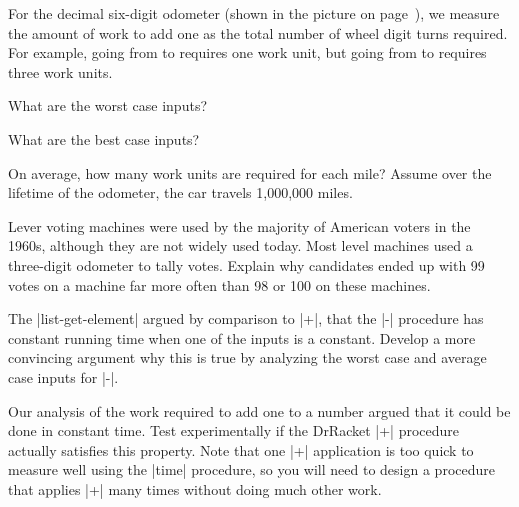 \begin{schemeregion}
\beforesplitex
\begin{exercise}
For the decimal six-digit odometer (shown in the picture on page~\pageref{picture:odometer}), we measure the amount of work to add one as the total number of wheel digit turns required.  For example, going from  to  requires one work unit, but going from  to  requires three work units.
\begin{subexerciselist}
\item What are the worst case inputs?
\solution{\LATER{}}
\item What are the best case inputs?
\solution{\LATER{}}
\item \goldstar On average, how many work units are required for each mile?  Assume over the lifetime of the odometer, the car travels 1,000,000 miles.
\solution{\LATER{}}
\item Lever voting machines were used by the majority of American voters in the 1960s, although they are not widely used today.  Most level machines used a three-digit odometer to tally votes.  Explain why candidates ended up with 99 votes on a machine far more often than 98 or 100 on these machines.
\solution{\LATER{}}
\end{subexerciselist}
\end{exercise}
\aftersplitex

\beforesplitex
\begin{exercise}\label{exercise:subtraction}\goldstar 
The \scheme|list-get-element| argued by comparison to \scheme|+|, that the \scheme|-| procedure has constant running time when one of the inputs is a constant.  Develop a more convincing argument why this is true by analyzing the worst case and average case inputs for \scheme|-|.
\solution{\LATER{}}
\end{exercise}
\aftersplitex

\beforesplitex
\begin{exercise}\goldstar Our analysis of the work required to add one to a number argued that it could be done in constant time.  Test experimentally if the DrRacket \scheme|+| procedure actually satisfies this property.  Note that one \scheme|+| application is too quick to measure well using the \scheme|time| procedure, so you will need to design a procedure that applies \scheme|+| many times without doing much other work.
\solution{\LATER{}}
\end{exercise}
\aftersplitex


\end{schemeregion}
